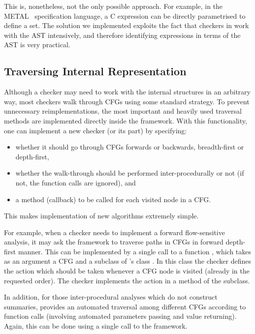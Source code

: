 This is, nonetheless, not the only possible approach. For example, in the
METAL~\cite{metal} specification language, a C expression can be directly
parametrised to define a set. The solution we implemented exploits the fact
that checkers in \stan work with the AST intensively, and therefore
identifying expressions in terms of the AST is very practical.

\subsection*{Traversing Internal Representation}\label{sec:travers}

Although a checker may need to work with the internal structures in an
arbitrary way, most checkers walk through CFGs using some standard
strategy. To prevent unnecessary reimplementations, the most important and
heavily used traversal methods are implemented directly inside the framework.
With this functionality, one can implement a new checker (or its part) by
specifying:
\begin{itemize}
\item whether it should go through CFGs forwards or backwards, breadth-first
  or depth-first,
\item whether the walk-through should be performed inter-procedurally or not
  (if not, the function calls are ignored), and
\item a method (callback) to be called for each visited node in a CFG.
\end{itemize}
This makes implementation of new algorithms extremely simple.

For example, when a checker needs to implement a forward flow-sensitive
analysis, it may ask the \stan framework to traverse paths in CFGs in forward
depth-first manner. This can be implemented by a single call to a function
, which takes as an argument a CFG and a
subclass of \stan's class . In this class the checker
defines the action which should be taken whenever a CFG node is visited
(already in the requested order). The checker implements the action in a
method  of the subclass.

In addition, for those inter-procedural analyses which do not construct
summaries, \stan provides an automated traversal among different CFGs
according to function calls (involving automated parameters passing and
value returning). Again, this can be done using a single call to the \stan
framework.  

